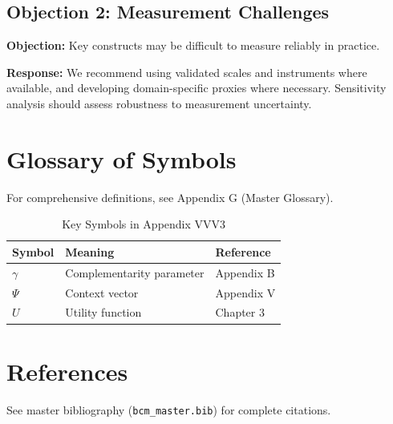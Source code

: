 \subsection{Objection 2: Measurement Challenges}

\textbf{Objection:} Key constructs may be difficult to measure reliably in
practice.

\textbf{Response:} We recommend using validated scales and instruments where
available, and developing domain-specific proxies where necessary. Sensitivity
analysis should assess robustness to measurement uncertainty.



\section{Glossary of Symbols}
\label{sec:vvv3-glossary}

For comprehensive definitions, see Appendix G (Master Glossary).

\begin{table}[htbp]
\centering
\caption{Key Symbols in Appendix VVV3}
\begin{tabular}{lll}
\toprule
\textbf{Symbol} & \textbf{Meaning} & \textbf{Reference} \\
\midrule
$\gamma$ & Complementarity parameter & Appendix B \\
$\Psi$ & Context vector & Appendix V \\
$U$ & Utility function & Chapter 3 \\
\bottomrule
\end{tabular}
\end{table}


\section{References}
\label{sec:references}

See master bibliography (\texttt{bcm\_master.bib}) for complete citations.

\nocite{bcm_master}



